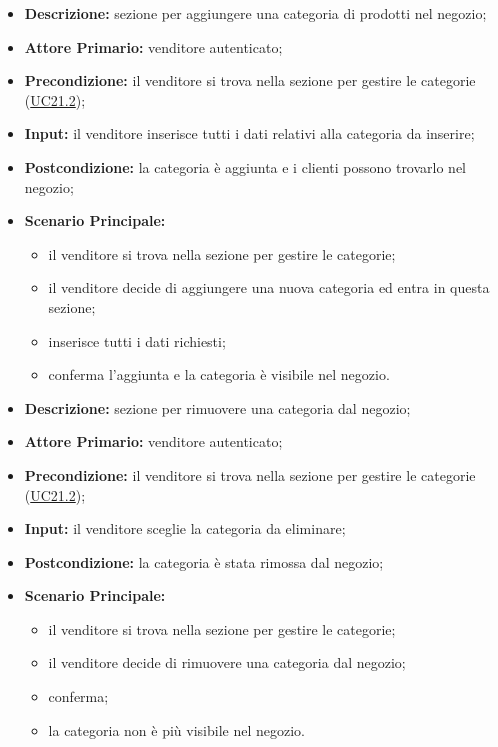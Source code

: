         \begin{itemize}
            \item \textbf{Descrizione:} sezione per aggiungere una categoria di prodotti nel negozio;
            \item \textbf{Attore Primario:} venditore autenticato;
            \item \textbf{Precondizione:} il venditore si trova nella sezione per gestire le categorie (\hyperref[sec:UC21.2]{UC21.2});
            \item \textbf{Input:} il venditore inserisce tutti i dati relativi alla categoria da inserire;
            \item \textbf{Postcondizione:} la categoria è aggiunta e i clienti possono trovarlo nel negozio;
            \item \textbf{Scenario Principale:} 
                \begin{itemize}
                    \item il venditore si trova nella sezione per gestire le categorie;
                    \item il venditore decide di aggiungere una nuova categoria ed entra in questa sezione;
                    \item inserisce tutti i dati richiesti;
                    \item conferma l'aggiunta e la categoria è visibile nel negozio.
                \end{itemize}
        \end{itemize}
        \begin{itemize}
            \item \textbf{Descrizione:} sezione per rimuovere una categoria dal negozio;
            \item \textbf{Attore Primario:} venditore autenticato;
            \item \textbf{Precondizione:} il venditore si trova nella sezione per gestire le categorie (\hyperref[sec:UC21.2]{UC21.2});
            \item \textbf{Input:} il venditore sceglie la categoria da eliminare;
            \item \textbf{Postcondizione:} la categoria è stata rimossa dal negozio;
            \item \textbf{Scenario Principale:} 
                \begin{itemize}
                    \item il venditore si trova nella sezione per gestire le categorie;
                    \item il venditore decide di rimuovere una categoria dal negozio;
                    \item conferma;
                    \item la categoria non è più visibile nel negozio.
                \end{itemize}
        \end{itemize}
